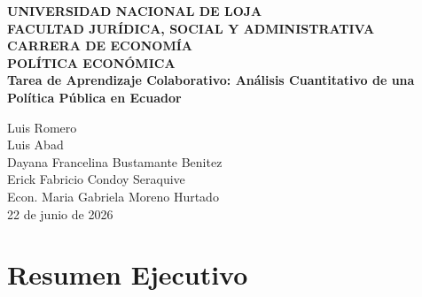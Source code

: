 \documentclass[12pt,spanish]{article}
\begin{document}
\begin{center}
    {\bfseries \Large UNIVERSIDAD NACIONAL DE LOJA}\\[0.3cm]
    {\bfseries \large FACULTAD JURÍDICA, SOCIAL Y
ADMINISTRATIVA}\\[0.2cm]
    {\bfseries CARRERA DE ECONOMÍA}\\[1.5cm]
    
    {\bfseries \large POLÍTICA ECONÓMICA}\\[1cm]
    
    {\bfseries \Large Tarea de Aprendizaje Colaborativo: Análisis
Cuantitativo de una Política Pública en Ecuador}\\[1.5cm]
\end{center}

\begin{center}
                        Luis Romero \\
                    Luis Abad \\
                    Dayana Francelina Bustamante Benitez \\
                    Erick Fabricio Condoy Seraquive \\
                \vspace{0.5cm}
    Econ. Maria Gabriela Moreno Hurtado \\ 
    22 de junio de 2026
\end{center}

\vspace{1cm}

\doublespacing
\setlength{\parindent}{1.27cm}

\newpage

\section*{Resumen Ejecutivo}\label{resumen-ejecutivo}
\end{document}

